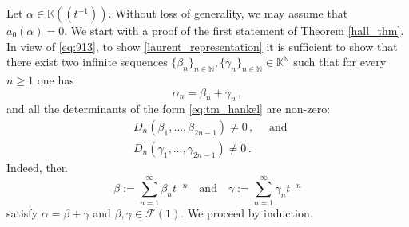 \documentclass[a4paper,12pt]{article}
\def\fq{\bbk}
\def\fttt{\fq\!\left(\!\left(t^{-1}\right)\!\right)}
\def\bbn{\mathbb{N}}
\def\bbk{\mathbb{K}}
\def\calf{\mathcal{F}}
\newcommand{\HankelPolynomial}{D}
\begin{document}
Let $\alpha\in\fttt$. Without loss of generality, we may assume that $a_0(\alpha)=0$. 
We start with a proof of the first statement of Theorem \ref{hall_thm}. 
In view of \eqref{eq:913}, to show \eqref{laurent_representation} it is sufficient to show that there exist two infinite sequences $\{\beta_n\}_{n\in\bbn},\{\gamma_n\}_{n\in\bbn}\in\fq^\bbn$ such that for every $n\ge 1$ one has 
\begin{equation}
\label{sum_cond}
\alpha_n=\beta_n+\gamma_n\,,
\end{equation}
and all the determinants of the form \eqref{eq:tm_hankel} are non-zero:
\begin{align}
\label{nonzero_cond_beta}
&\HankelPolynomial_n(\beta_1,\ldots,\beta_{2n-1})\neq0\,,\quad\textrm{ and }
\\
\label{nonzero_cond_gamma}
&\HankelPolynomial_n(\gamma_1,\ldots,\gamma_{2n-1})\neq0\,.
\end{align}
Indeed, then 
$$
\beta:=\sum\limits_{n=1}^{\infty}\beta_n t^{-n}\quad\textrm{and}\quad
\gamma:=\sum\limits_{n=1}^{\infty}\gamma_n t^{-n}
$$
satisfy $\alpha=\beta+\gamma$ and $\beta,\gamma\in\calf(1)$.
We proceed by induction.
\end{document}
